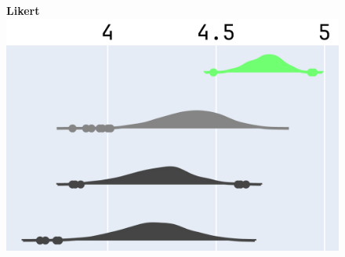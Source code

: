 \documentclass[lettersize,journal]{IEEEtran}
\begin{document}
\begin{figure}[p]
{\begin{minipage}{\textwidth}
\begin{minipage}[t]{0.96\textwidth}
\begin{minipage}[t]{0.31\textwidth}
      \end{minipage}
      \hspace{0.01\textwidth}%
      \begin{minipage}[t]{0.31\textwidth}
        \centering
        \normalsize\bfseries Likert\\[0.3em]
        \includegraphics[width=\linewidth]{images/npsk_likert_0.png}
      \end{minipage}
    \end{minipage}
  \end{minipage}
  \label{fig:npsk_p0}
}\\[0.5em]


\end{figure}
\end{document}
